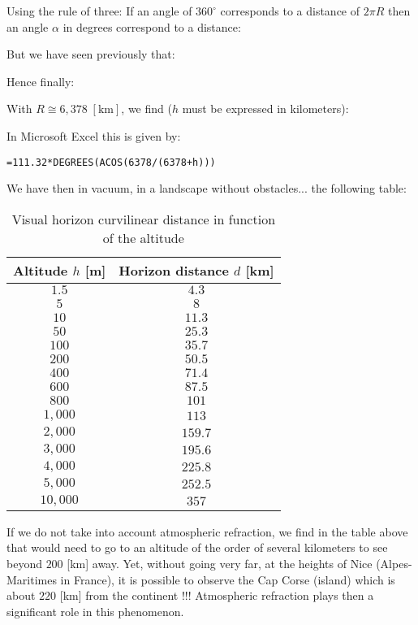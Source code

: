 	Using the rule of three:
	If an angle of $360^{\circ}$ corresponds to a distance of $2\pi R$ then an angle $\alpha$ in degrees correspond to a distance:
	
	But we have seen previously that:
	
	Hence finally:
	
	With $R\cong 6,378\;[\text{km}]$, we find ($h$ must be expressed in kilometers):
	
	In Microsoft Excel this is given by:
	\begin{center}
	\texttt{=111.32*DEGREES(ACOS(6378/(6378+h)))}
	\end{center}
	We have then in vacuum, in a landscape without obstacles... the following table:
	\begin{table}[H]
	\begin{center}
			\begin{tabular}{|c|c|}
				\hline
				\multicolumn{1}{c}{\cellcolor{black!30}\textbf{Altitude $h$ [m]}} & 
\multicolumn{1}{c}{\cellcolor{black!30}\textbf{Horizon distance $d$ [km]}} \\ \hline
		$1.5$ & $4.3$\\ \hline
		$5$ & $8$\\ \hline
		$10$ & $11.3$\\ \hline
		$50$ & $25.3$\\ \hline
		$100$ & $35.7$\\ \hline
		$200$ & $50.5$\\ \hline
		$400$ & $71.4$\\ \hline
		$600$ & $87.5$\\ \hline
		$800$ & $101$\\ \hline
		$1,000$ & $113$\\ \hline
		$2,000$ & $159.7$\\ \hline
		$3,000$ & $195.6$\\ \hline
		$4,000$ & $225.8$\\ \hline
		$5,000$ & $252.5$\\ \hline
		$10,000$ & $357$\\ \hline
	\end{tabular}
	\end{center}
	\caption{Visual horizon curvilinear distance in function of the altitude}
	\end{table}	
	\begin{tcolorbox}[title=Remark,colframe=black,arc=10pt]
	If we do not take into account atmospheric refraction, we find in the table above that would need to go to an altitude of the order of several kilometers to see beyond $200$ [km] away. Yet, without going very far, at the heights of Nice (Alpes-Maritimes in France), it is possible to observe the Cap Corse (island) which is about $220$ [km] from the continent !!! Atmospheric refraction plays then a significant role in this phenomenon.
	\end{tcolorbox}
